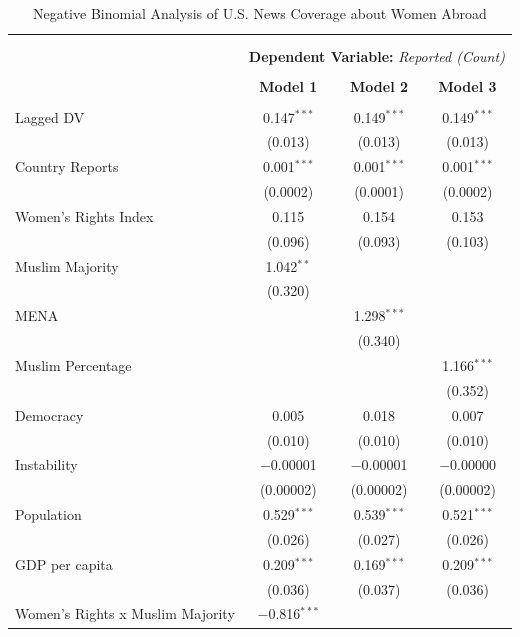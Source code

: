 \documentclass[11pt, oneside]{article}
\begin{document}
\begin{table}[!htbp] \centering 
  \caption{Negative Binomial Analysis of U.S. News Coverage about Women Abroad} 
  \label{table:negbin} 
\begin{tabular}{@{\extracolsep{5pt}}lccc} 
\\[-1.8ex]\hline \\[-1.8ex] 
\\[-1.8ex] & \multicolumn{3}{c}{\textbf{Dependent Variable:} \emph{Reported (Count)}} \\
\\[-1.8ex] & \textbf{Model 1} & \textbf{Model 2} & \textbf{Model 3}\\ 
\hline \\[-1.8ex] 
 Lagged DV & 0.147$^{***}$ & 0.149$^{***}$ & 0.149$^{***}$ \\ 
  & (0.013) & (0.013) & (0.013) \\ 
  Country Reports & 0.001$^{***}$ & 0.001$^{***}$ & 0.001$^{***}$ \\ 
  & (0.0002) & (0.0001) & (0.0002) \\ 
  Women's Rights Index & 0.115 & 0.154 & 0.153 \\ 
  & (0.096) & (0.093) & (0.103) \\ 
  Muslim Majority & 1.042$^{**}$ &  &  \\ 
  & (0.320) &  &  \\ 
  MENA &  & 1.298$^{***}$ &  \\ 
  &  & (0.340) &  \\ 
  Muslim Percentage &  &  & 1.166$^{***}$ \\ 
  &  &  & (0.352) \\ 
  Democracy & 0.005 & 0.018 & 0.007 \\ 
  & (0.010) & (0.010) & (0.010) \\ 
  Instability & $-$0.00001 & $-$0.00001 & $-$0.00000 \\ 
  & (0.00002) & (0.00002) & (0.00002) \\ 
  Population & 0.529$^{***}$ & 0.539$^{***}$ & 0.521$^{***}$ \\ 
  & (0.026) & (0.027) & (0.026) \\ 
  GDP per capita & 0.209$^{***}$ & 0.169$^{***}$ & 0.209$^{***}$ \\ 
  & (0.036) & (0.037) & (0.036) \\ 
  Women's Rights x Muslim Majority & $-$0.816$^{***}$ &  &  \\ 

\end{tabular}
\end{table}
\end{document}
